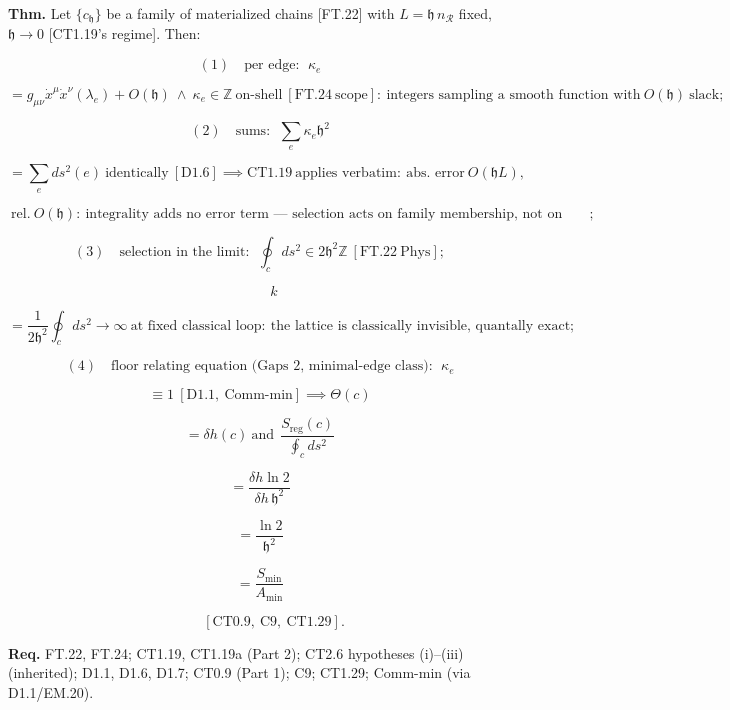 \begin{theorem}\label{tag:FT-31}
\textbf{Thm.} Let $\{c_{\mathfrak h}\}$ be a family of materialized chains [FT.22] with $L=\mathfrak h\,n_{\mathcal R}$ fixed, $\mathfrak h\to0$ [CT1.19's regime]. Then:

\[
(1)\quad\text{per edge}:\ \ \kappa_e
\]

\[
= g_{\mu\nu}\dot x^\mu\dot x^\nu(\lambda_e)+O(\mathfrak h)\ \wedge\ \kappa_e\in\mathbb Z\ \text{on-shell}\ [\mathrm{FT.24}\ \text{scope}]:\ \text{integers sampling a smooth function with}\ O(\mathfrak h)\ \text{slack};
\]

\[
(2)\quad\text{sums}:\ \ \sum_e\kappa_e\mathfrak h^2
\]

\[
= \sum_e ds^2(e)\ \text{identically}\ [\mathrm{D1.6}]\implies\mathrm{CT1.19}\ \text{applies verbatim}:\ \text{abs. error}\ O(\mathfrak hL),
\]

\[
\ \text{rel.}\ O(\mathfrak h):\ \text{integrality adds no error term — selection acts on family membership, not on sums};
\]

\[
(3)\quad\text{selection in the limit}:\ \ \oint_c ds^2\in2\mathfrak h^2\mathbb Z\ [\mathrm{FT.22}\ \mathrm{Phys}];
\]

\[
\qquad k
\]

\[
= \frac{1}{2\mathfrak h^2}\oint_c ds^2\to\infty\ \text{at fixed classical loop}:\ \text{the lattice is classically invisible, quantally exact};
\]

\[
(4)\quad\text{floor relating equation (Gaps 2, minimal-edge class)}:\ \ \kappa_e
\]

\[
\equiv 1\ [\mathrm{D1.1},\ \text{Comm-min}]\implies\Theta(c)
\]

\[
= \delta h(c)\ \text{and}\ \ \frac{S_{\mathrm{reg}}(c)}{\oint_c ds^2}
\]

\[
= \frac{\delta h\ln2}{\delta h\,\mathfrak h^2}
\]

\[
= \frac{\ln2}{\mathfrak h^2}
\]

\[
= \frac{S_{\min}}{A_{\min}}
\]

\[
\qquad [\mathrm{CT0.9},\ \mathrm{C9},\ \mathrm{CT1.29}].
\]

\textbf{Req.} FT.22, FT.24; CT1.19, CT1.19a (Part 2); CT2.6 hypotheses (i)–(iii) (inherited); D1.1, D1.6, D1.7; CT0.9 (Part 1); C9; CT1.29; Comm-min (via D1.1/EM.20).


\end{theorem}
